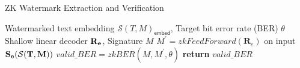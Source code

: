 



\begin{algorithm}[h]
\small
\caption{ZK Watermark Extraction and Verification}
\label{alg:extract}
\begin{algorithmic} [1]
     Watermarked text embedding $\mathcal{S}(T, M)_\textsf{embed}$, Target bit error rate (BER) $\theta$
     Shallow linear decoder $\bf{R}_e$, Signature $M$
    \STATE \hspace{1em} $M^\prime = zkFeedForward(\mathbf{R}_e)$ on input $\bf{S}_e(\mathcal{S}(T, M))$
    \STATE \hspace{1em} $valid\_BER = zkBER(M, M^\prime, \theta)$ 
    \STATE \hspace*{1em}  \textbf{return} $valid\_BER$
    
\end{algorithmic}
\end{algorithm}



